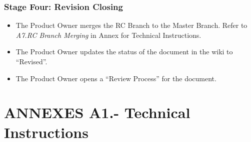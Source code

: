 \documentclass{template/openetcs_article}
\begin{document}
\subsubsection{Stage Four: Revision Closing}
\begin{itemize}
\item The Product Owner merges the RC Branch to the Master Branch. Refer to {\it A7.RC Branch Merging} in Annex for Technical Instructions.
\item The Product Owner updates the status of the document in the wiki to “Revised”. 
\item The Product Owner opens a “Review Process” for the document.
\end{itemize}

\section{ANNEXES A1.- Technical Instructions}
\end{document}
